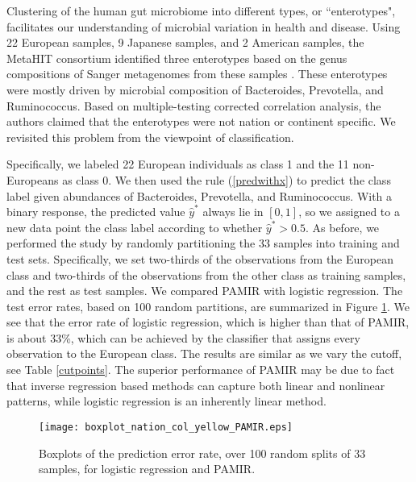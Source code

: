 \documentclass[12pt]{article}
\begin{document}
Clustering of the human gut microbiome into different types, or ``enterotypes", facilitates our understanding of microbial variation in health and disease. Using 22 European samples, 9 Japanese samples, and 2 American samples,
the MetaHIT consortium identified three enterotypes based on the genus compositions of Sanger metagenomes from these samples \citep{arumugam2011enterotypes}. These enterotypes were mostly driven by microbial composition of Bacteroides, Prevotella, and Ruminococcus. Based on multiple-testing corrected correlation analysis, the authors claimed that the enterotypes were not nation or continent specific. We revisited this problem from the viewpoint of classification.

Specifically, we labeled 22 European individuals as class 1 and the 11 non-Europeans as class 0. We then used the rule (\ref{predwithx}) to predict the class label given abundances of Bacteroides, Prevotella, and Ruminococcus. With a binary response, the predicted value $\hat{y}^*$ always lie in $[0, 1]$, so we assigned to a new data point the class label according to whether $\hat{y}^* > 0.5$. As before, we performed the study by randomly partitioning the 33 samples into training and test sets. Specifically, we set two-thirds of the observations from the European class and two-thirds of the observations from the other class as training samples, and the rest as test samples. We compared PAMIR with logistic regression. The test error rates, based on 100 random partitions, are summarized in Figure \ref{fig4}. We see that the error rate of logistic regression, which is higher than that of PAMIR, is about 33\%, which can be achieved by the classifier that assigns every observation to the European class. The results are similar as we vary the cutoff, see Table \ref{cutpoints}. The superior performance of PAMIR may be due to fact that inverse regression based methods can capture both linear and nonlinear patterns, while logistic regression is an inherently linear method.

\begin{figure}
 \centerline{\texttt{[image: boxplot\_nation\_col\_yellow\_PAMIR.eps]}}
\caption{Boxplots of the prediction error rate, over 100 random splits of 33 samples, for logistic regression and PAMIR.
} \label{fig4}
\end{figure}
\end{document}
